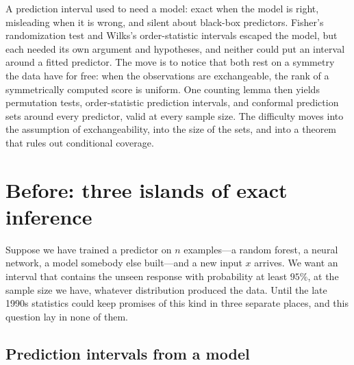 \newcommand{\conformaleqd}{\overset{\mathrm{d}}{=}}
\newcommand{\conformalLeb}{\operatorname{Leb}}
\newcommand{\conformalQuant}{\operatorname{Quantile}}
\newcommand{\conformalerr}{\mathrm{err}}

\begin{refsection}

\begin{chaptersummary}
A prediction interval used to need a model: exact when the model is right, misleading when it is wrong, and silent about black-box predictors. Fisher's randomization test and Wilks's order-statistic intervals escaped the model, but each needed its own argument and hypotheses, and neither could put an interval around a fitted predictor. The move is to notice that both rest on a symmetry the data have for free: when the observations are exchangeable, the rank of a symmetrically computed score is uniform. One counting lemma then yields permutation tests, order-statistic prediction intervals, and conformal prediction sets around every predictor, valid at every sample size. The difficulty moves into the assumption of exchangeability, into the size of the sets, and into a theorem that rules out conditional coverage.
\end{chaptersummary}

\section{Before: three islands of exact inference}\label{sec:conformal:before}

Suppose we have trained a predictor on $n$ examples---a random forest, a neural network, a model somebody else built---and a new input $x$ arrives. We want an interval that contains the unseen response with probability at least $95\%$, at the sample size we have, whatever distribution produced the data. Until the late 1990s statistics could keep promises of this kind in three separate places, and this question lay in none of them.

\subsection{Prediction intervals from a model}\label{sec:conformal:model}


\end{refsection}
